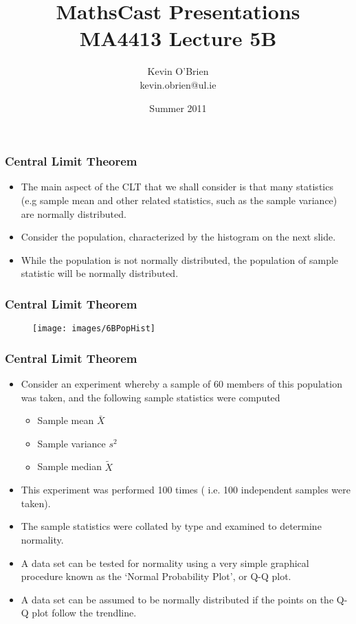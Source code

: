 \documentclass[a4]{beamer}
\title[MathsCast]{MathsCast Presentations \\ {\normalsize MA4413 Lecture 5B}}
\author[Kevin O'Brien]{Kevin O'Brien \\ {\scriptsize kevin.obrien@ul.ie}}
\date{Summer 2011}
\institute[Maths \& Stats]{Dept. of Mathematics \& Statistics, \\ University \textit{of} Limerick}
\begin{document}
\begin{frame}
\titlepage
\end{frame}
\begin{frame}
\frametitle{Central Limit Theorem}
\begin{itemize}
\item The main aspect of the CLT that we shall consider is that many statistics (e.g sample mean and other related statistics, such as the sample variance) are normally distributed.
\item Consider the population, characterized by the histogram on the next slide.
\item While the population is not normally distributed, the population of sample statistic will be normally distributed.
\end{itemize}
\end{frame}
\begin{frame}
\frametitle{Central Limit Theorem}
\begin{figure}
  \texttt{[image: images/6BPopHist]}\\

\end{figure}

\end{frame}
\begin{frame}
\frametitle{Central Limit Theorem}
\begin{itemize}
\item Consider an experiment whereby a sample of 60 members of this population was taken, and the following sample statistics were computed
    \begin{itemize}
    \item Sample mean $\bar{X}$
    \item Sample variance $s^2$
    \item Sample median $\tilde{X}$
    \end{itemize}
\item This experiment was performed 100 times ( i.e. 100 independent samples were taken).
\item The sample statistics were collated by type and examined to determine normality.
\item A data set can be tested for normality using a very simple graphical procedure known as the `Normal Probability Plot', or Q-Q plot.
\item A data set can be assumed to be normally distributed if the points on the Q-Q plot follow the trendline.
\end{itemize}
\end{frame}
\end{document}
